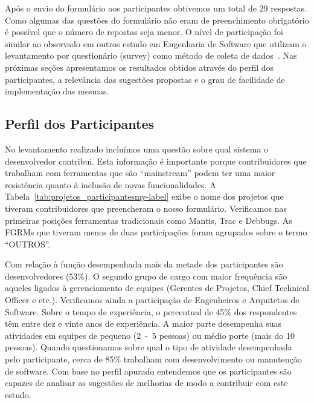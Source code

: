 Após o envio do formulário aos participantes obtivemos um total de 29 respostas.
Como algumas das questões do formulário não eram de preenchimento obrigatório é
possível que o número de repostas seja menor. O nível de participação foi
similar ao observado em outros estudo em Engenharia de Software que utilizam o
levantamento por questionário (survey) como método de coleta de
dados~\cite{fan2010factors}. Nas próximas seções apresentamos os resultados
obtidos através do perfil dos participantes, a relevância das sugestões
propostas e o grau de facilidade de implementação das mesmas.

\subsection{Perfil dos Participantes}
\label{sub:sug_melhorias_resultados_perfil_dos_participantes}

No levantamento realizado incluímos uma questão sobre qual sistema o
desenvolvedor contribui. Esta informação é importante porque contribuidores que
trabalham com ferramentas que são ``mainstream'' podem ter uma maior resistência
quanto à inclusão de novas funcionalidades. A
Tabela~\ref{tab:projetos_participantesmy-label} exibe o nome dos projetos que
tiveram contribuidores que preencheram o nosso formulário. Verificamos nas
primeiras posições ferramentas tradicionais como Mantis, Trac e Debbugs. As
FGRMs que tiveram menos de duas participações foram agrupados sobre o termo
``OUTROS''.

\begin{table}[htpb]
\centering
{}
\caption{Projetos que os participantes contribuem.}
\label{tab:projetos_participantesmy-label}
\end{table}

Com relação à função desempenhada mais da metade dos participantes são
desenvolvedores (53\%). O segundo grupo de cargo com maior frequência são
aqueles ligados à gerenciamento de equipes (Gerentes de Projetos, Chief
Technical Officer e etc.). Verificamos ainda a participação de Engenheiros e
Arquitetos de Software. Sobre o tempo de experiência, o percentual de 45\% dos
respondentes têm entre dez e vinte anos de experiência. A maior parte desempenha
suas atividades em equipes de pequeno (2~-~5 pessoas) ou médio porte (mais do 10
pessoas). Quando questionamos sobre qual o tipo de atividade desempenhada pelo
participante, cerca de 85\% trabalham com desenvolvimento ou manutenção de
software. Com base no perfil apurado entendemos que os participantes são capazes
de analisar as sugestões de melhorias de modo a contribuir com este estudo.

